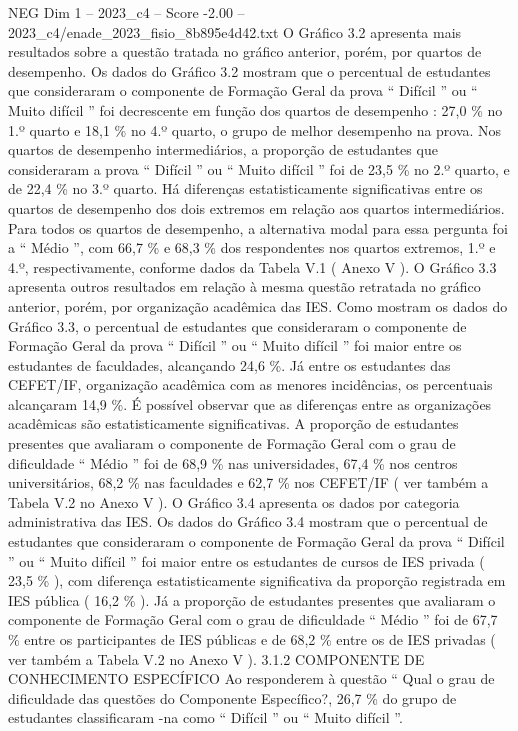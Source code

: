 \begin{textsample}{NEG Dim 1 – 2023\_c4 – Score -2.00 – 2023\_c4/enade\_2023\_fisio\_8b895e4d42.txt}
O Gráfico 3.2 apresenta mais resultados sobre a questão tratada no gráfico anterior, porém, por quartos de desempenho.
Os dados do Gráfico 3.2 mostram que o percentual de estudantes que consideraram o componente de Formação Geral da prova “ Difícil ” ou “ Muito difícil ” foi decrescente em função dos quartos de desempenho : 27,0 \% no 1.º quarto e 18,1 \% no 4.º quarto, o grupo de melhor desempenho na prova.
Nos quartos de desempenho intermediários, a proporção de estudantes que consideraram a prova “ Difícil ” ou “ Muito difícil ” foi de 23,5 \% no 2.º quarto, e de 22,4 \% no 3.º quarto.
Há diferenças estatisticamente significativas entre os quartos de desempenho dos dois extremos em relação aos quartos intermediários.
Para todos os quartos de desempenho, a alternativa modal para essa pergunta foi a “ Médio ”, com 66,7 \% e 68,3 \% dos respondentes nos quartos extremos, 1.º e 4.º, respectivamente, conforme dados da Tabela V.1 ( Anexo V ).
O Gráfico 3.3 apresenta outros resultados em relação à mesma questão retratada no gráfico anterior, porém, por organização acadêmica das IES.
Como mostram os dados do Gráfico 3.3, o percentual de estudantes que consideraram o componente de Formação Geral da prova “ Difícil ” ou “ Muito difícil ” foi maior entre os estudantes de faculdades, alcançando 24,6 \%.
Já entre os estudantes das CEFET/IF, organização acadêmica com as menores incidências, os percentuais alcançaram 14,9 \%.
É possível observar que as diferenças entre as organizações acadêmicas são estatisticamente significativas.
A proporção de estudantes presentes que avaliaram o componente de Formação Geral com o grau de dificuldade “ Médio ” foi de 68,9 \% nas universidades, 67,4 \% nos centros universitários, 68,2 \% nas faculdades e 62,7 \% nos CEFET/IF ( ver também a Tabela V.2 no Anexo V ).
O Gráfico 3.4 apresenta os dados por categoria administrativa das IES.
Os dados do Gráfico 3.4 mostram que o percentual de estudantes que consideraram o componente de Formação Geral da prova “ Difícil ” ou “ Muito difícil ” foi maior entre os estudantes de cursos de IES privada ( 23,5 \% ), com diferença estatisticamente significativa da proporção registrada em IES pública ( 16,2 \% ).
Já a proporção de estudantes presentes que avaliaram o componente de Formação Geral com o grau de dificuldade “ Médio ” foi de 67,7 \% entre os participantes de IES públicas e de 68,2 \% entre os de IES privadas ( ver também a Tabela V.2 no Anexo V ). 3.1.2 COMPONENTE DE CONHECIMENTO ESPECÍFICO Ao responderem à questão “ Qual o grau de dificuldade das questões do Componente Específico?, 26,7 \% do grupo de estudantes classificaram -na como “ Difícil ” ou “ Muito difícil ”.

\end{textsample}
